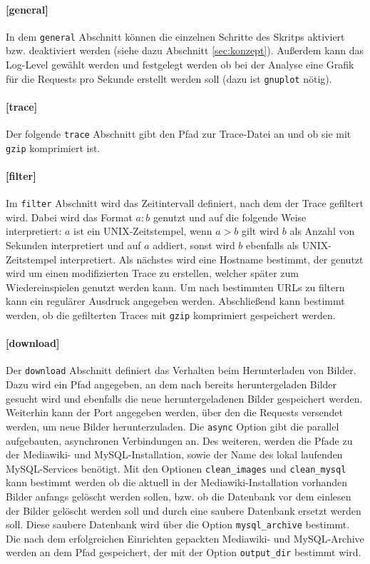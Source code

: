 \paragraph{[general]}

In dem \texttt{general} Abschnitt können die einzelnen Schritte des Skritps aktiviert bzw. deaktiviert werden (siehe dazu Abschnitt \ref{sec:konzept}). Außerdem kann das Log-Level gewählt werden und festgelegt werden ob bei der Analyse eine Grafik für die Requests pro Sekunde erstellt werden soll (dazu ist \texttt{gnuplot} nötig).

\paragraph{[trace]}

Der folgende \texttt{trace} Abschnitt gibt den Pfad zur Trace-Datei an und ob sie mit \texttt{gzip} komprimiert ist.

\paragraph{[filter]}

Im \texttt{filter} Abschnitt wird das Zeitintervall definiert, nach dem der Trace gefiltert wird. Dabei wird das Format $a:b$ genutzt und auf die folgende Weise interpretiert: $a$ ist ein UNIX-Zeitstempel, wenn $a > b$ gilt wird $b$ als Anzahl von Sekunden interpretiert und auf $a$ addiert, sonst wird $b$ ebenfalls als UNIX-Zeitstempel interpretiert. Als nächstes wird eine Hostname bestimmt, der genutzt wird um einen modifizierten Trace zu erstellen, welcher später zum Wiedereinspielen genutzt werden kann. Um nach bestimmten URLs zu filtern kann ein regulärer Ausdruck angegeben werden. Abschließend kann bestimmt werden, ob die gefilterten Traces mit \texttt{gzip} komprimiert gespeichert werden.

\paragraph{[download]}

Der \texttt{download} Abschnitt definiert das Verhalten beim Herunterladen von Bilder. Dazu wird ein Pfad angegeben, an dem nach bereits heruntergeladen Bilder gesucht wird und ebenfalls die neue heruntergeladenen Bilder gespeichert werden. Weiterhin kann der Port angegeben werden, über den die Requests versendet werden, um neue Bilder herunterzuladen. Die \texttt{async} Option gibt die parallel aufgebauten, asynchronen Verbindungen an. Des weiteren, werden die Pfade zu der Mediawiki- und MySQL-Installation, sowie der Name des lokal laufenden MySQL-Services benötigt. Mit den Optionen \texttt{clean\_images} und \texttt{clean\_mysql} kann bestimmt werden ob die aktuell in der Mediawiki-Installation vorhanden Bilder anfangs gelöscht werden sollen, bzw. ob die Datenbank vor dem einlesen der Bilder gelöscht werden soll und durch eine \glqq{}saubere\grqq{} Datenbank ersetzt werden soll. Diese \glqq{}saubere\grqq{} Datenbank wird über die Option \texttt{mysql\_archive} bestimmt. Die nach dem erfolgreichen Einrichten gepackten Mediawiki- und MySQL-Archive werden an dem Pfad gespeichert, der mit der Option \texttt{output\_dir} bestimmt wird.

